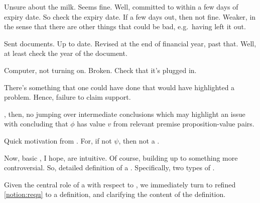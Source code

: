 \begin{note}
  Unsure about the milk.
  Seems fine.
  Well, committed to within a few days of expiry date.
  So check the expiry date.
  If a few days out, then not fine.
  Weaker, in the sense that there are other things that could be bad, e.g.\ having left it out.
\end{note}

\begin{note}
  Sent documents.
  Up to date.
  Revised at the end of financial year, past that.
  Well, at least check the year of the document.
\end{note}

\begin{note}
  Computer, not turning on.
  Broken.
  Check that it's plugged in.
\end{note}

\begin{note}
  There's something that one could have done that would have highlighted a problem.
  Hence, failure to claim support.

  \ideaCS{}, then, no jumping over intermediate conclusions which may highlight an issue with concluding that \(\phi\) has value \(v\) from relevant premise proposition-value pairs.
\end{note}

\begin{note}
  Quick motivation from \support{}.
  For, if not \(\psi\), then not a \sink{}.
\end{note}

\begin{note}
  Now, basic , I hope, are intuitive.
  Of course, building up to something more controversial.
  So, detailed definition of a \requ{}.
  Specifically, two types of \requ{}.
\end{note}

\begin{note}
  Given the central role of a \requ{} with respect to \ideaCS{}, we immediately turn to refined     \autoref{notion:requ} to a definition, and clarifying the content of the definition.
\end{note}

\subsection{}
\label{sec:requ3}


